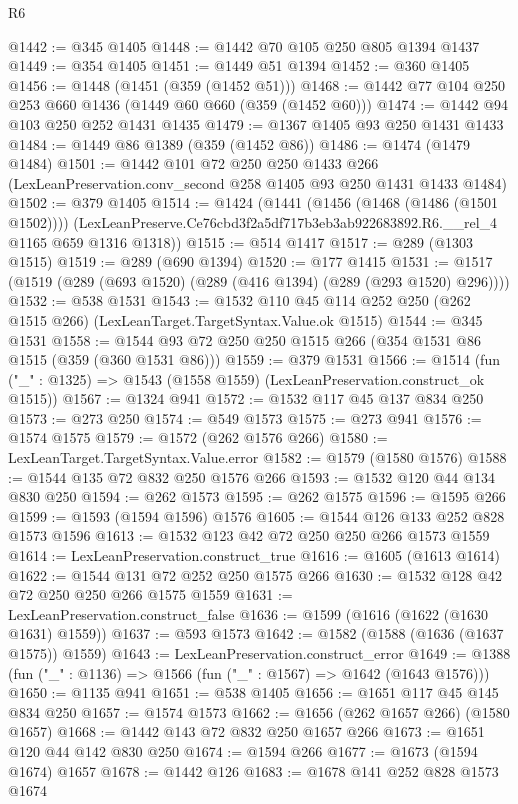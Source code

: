 \begin{lexlean}{R6}
\begin{coremodule}
@1442 := @345 @1405
@1448 := @1442 @70 @105 @250 @805 @1394 @1437
@1449 := @354 @1405
@1451 := @1449 @51 @1394
@1452 := @360 @1405
@1456 := @1448 (@1451 (@359 (@1452 @51)))
@1468 := @1442 @77 @104 @250 @253 @660 @1436 (@1449 @60 @660 (@359 (@1452 @60)))
@1474 := @1442 @94 @103 @250 @252 @1431 @1435
@1479 := @1367 @1405 @93 @250 @1431 @1433
@1484 := @1449 @86 @1389 (@359 (@1452 @86))
@1486 := @1474 (@1479 @1484)
@1501 := @1442
    @101
    @72
    @250
    @250
    @1433
    @266
    (LexLeanPreservation.conv_second @258 @1405 @93 @250 @1431 @1433 @1484)
@1502 := @379 @1405
@1514 := @1424
    (@1441
      (@1456 (@1468 (@1486 (@1501 @1502))))
      (LexLeanPreserve.Ce76cbd3f2a5df717b3eb3ab922683892.R6.__rel_4 @1165 @659 @1316 @1318))
@1515 := @514 @1417
@1517 := @289 (@1303 @1515)
@1519 := @289 (@690 @1394)
@1520 := @177 @1415
@1531 := @1517 (@1519 (@289 (@693 @1520) (@289 (@416 @1394) (@289 (@293 @1520) @296))))
@1532 := @538 @1531
@1543 := @1532 @110 @45 @114 @252 @250 (@262 @1515 @266) (LexLeanTarget.TargetSyntax.Value.ok @1515)
@1544 := @345 @1531
@1558 := @1544 @93 @72 @250 @250 @1515 @266 (@354 @1531 @86 @1515 (@359 (@360 @1531 @86)))
@1559 := @379 @1531
@1566 := @1514 (fun ("_" : @1325) => @1543 (@1558 @1559) (LexLeanPreservation.construct_ok @1515))
@1567 := @1324 @941
@1572 := @1532 @117 @45 @137 @834 @250
@1573 := @273 @250
@1574 := @549 @1573
@1575 := @273 @941
@1576 := @1574 @1575
@1579 := @1572 (@262 @1576 @266)
@1580 := LexLeanTarget.TargetSyntax.Value.error
@1582 := @1579 (@1580 @1576)
@1588 := @1544 @135 @72 @832 @250 @1576 @266
@1593 := @1532 @120 @44 @134 @830 @250
@1594 := @262 @1573
@1595 := @262 @1575
@1596 := @1595 @266
@1599 := @1593 (@1594 @1596) @1576
@1605 := @1544 @126 @133 @252 @828 @1573 @1596
@1613 := @1532 @123 @42 @72 @250 @250 @266 @1573 @1559
@1614 := LexLeanPreservation.construct_true
@1616 := @1605 (@1613 @1614)
@1622 := @1544 @131 @72 @252 @250 @1575 @266
@1630 := @1532 @128 @42 @72 @250 @250 @266 @1575 @1559
@1631 := LexLeanPreservation.construct_false
@1636 := @1599 (@1616 (@1622 (@1630 @1631) @1559))
@1637 := @593 @1573
@1642 := @1582 (@1588 (@1636 (@1637 @1575)) @1559)
@1643 := LexLeanPreservation.construct_error
@1649 := @1388 (fun ("_" : @1136) => @1566 (fun ("_" : @1567) => @1642 (@1643 @1576)))
@1650 := @1135 @941
@1651 := @538 @1405
@1656 := @1651 @117 @45 @145 @834 @250
@1657 := @1574 @1573
@1662 := @1656 (@262 @1657 @266) (@1580 @1657)
@1668 := @1442 @143 @72 @832 @250 @1657 @266
@1673 := @1651 @120 @44 @142 @830 @250
@1674 := @1594 @266
@1677 := @1673 (@1594 @1674) @1657
@1678 := @1442 @126
@1683 := @1678 @141 @252 @828 @1573 @1674

\end{coremodule}
\end{lexlean}
